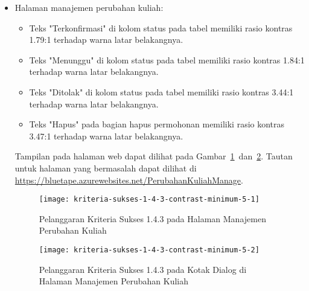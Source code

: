 \begin{itemize}
    \item Halaman manajemen perubahan kuliah: 
    \begin{itemize}
        \item Teks "Terkonfirmasi" di kolom status pada tabel memiliki rasio kontras 1.79:1 terhadap warna latar belakangnya.
        \item Teks "Menunggu" di kolom status pada tabel memiliki rasio kontras 1.84:1 terhadap warna latar belakangnya.
        \item Teks "Ditolak" di kolom status pada tabel memiliki rasio kontras 3.44:1 terhadap warna latar belakangnya.
        \item Teks "Hapus" pada bagian hapus permohonan memiliki rasio kontras 3.47:1 terhadap warna latar belakangnya.
    \end{itemize}
    Tampilan pada halaman web dapat dilihat pada \mbox{Gambar \ref{fig:1.4.3_contrast_minimum_5_1} dan \ref{fig:1.4.3_contrast_minimum_5_2}}. Tautan untuk halaman yang bermasalah dapat dilihat di \url{https://bluetape.azurewebsites.net/PerubahanKuliahManage}.
    \begin{figure}[H]
        \centering  
        \texttt{[image: kriteria-sukses-1-4-3-contrast-minimum-5-1]}  
        \caption[Pelanggaran Kriteria Sukses 1.4.3 pada Halaman Manajemen Perubahan Kuliah]{Pelanggaran Kriteria Sukses 1.4.3 pada Halaman Manajemen Perubahan Kuliah}
        \label{fig:1.4.3_contrast_minimum_5_1}
    \end{figure} 
    
    \begin{figure}[H]
        \centering  
        \texttt{[image: kriteria-sukses-1-4-3-contrast-minimum-5-2]}  
        \caption[Pelanggaran Kriteria Sukses 1.4.3 pada Kotak Dialog di Halaman Manajemen Perubahan Kuliah]{Pelanggaran Kriteria Sukses 1.4.3 pada Kotak Dialog di Halaman Manajemen Perubahan Kuliah}
        \label{fig:1.4.3_contrast_minimum_5_2}
    \end{figure} 


\end{itemize}
